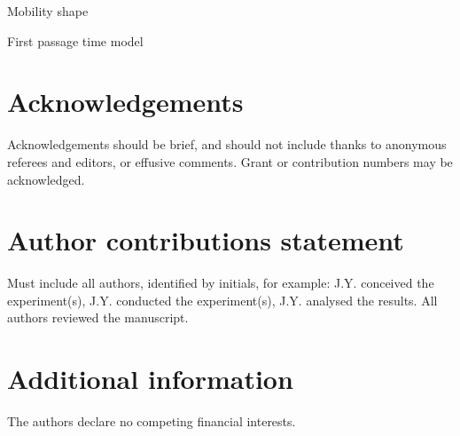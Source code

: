 \documentclass[fleqn,10pt]{wlscirep}
\begin{document}
Mobility shape

First passage time model





\section*{Acknowledgements}

Acknowledgements should be brief, and should not include thanks to anonymous referees and editors, or effusive comments. Grant or contribution numbers may be acknowledged.

\section*{Author contributions statement}

Must include all authors, identified by initials, for example:
J.Y. conceived the experiment(s),  J.Y. conducted the experiment(s), J.Y. analysed the results.  All authors reviewed the manuscript. 

\section*{Additional information}
The authors declare no competing financial interests.
\end{document}
